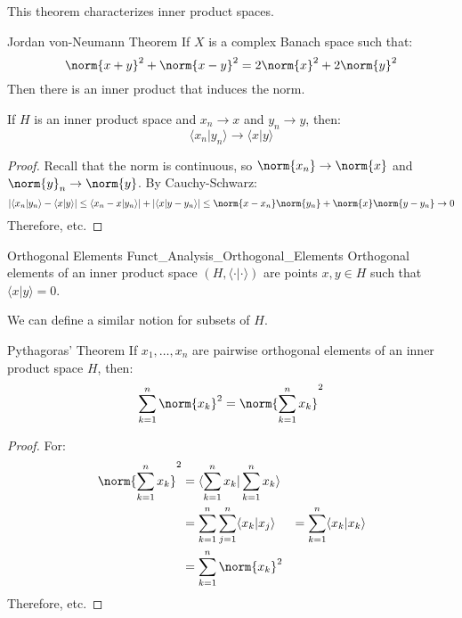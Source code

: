     This theorem characterizes inner product spaces.
    \begin{ltheorem}{Jordan von-Neumann Theorem}
        If $X$ is a complex Banach space such that:
        \begin{equation}
            \norm{x+y}^{2}+\norm{x-y}^{2}
            =2\norm{x}^{2}+2\norm{y}^{2}
        \end{equation}
        Then there is an inner product that induces
        the norm.
    \end{ltheorem}
    \begin{theorem}
        If $H$ is an inner product space and
        $x_{n}\rightarrow{x}$ and
        $y_{n}\rightarrow{y}$, then:
        \begin{equation}
            \langle{x_{n}|y_{n}}\rangle
            \rightarrow\langle{x|y}\rangle
        \end{equation}
    \end{theorem}
    \begin{proof}
        Recall that the norm is continuous, so
        $\norm{x_{n}}\rightarrow\norm{x}$ and
        $\norm{y}_{n}\rightarrow\norm{y}$. By Cauchy-Schwarz:
        \begin{equation}
            |\langle{x_{n}|y_{n}}\rangle-\langle{x|y}\rangle|
            \leq\langle{x_{n}-x|y_{n}}\rangle|+
                |\langle{x|y-y_{n}}\rangle|
            \leq\norm{x-x_{n}}\norm{y_{n}}+
                \norm{x}\norm{y-y_{n}}
            \rightarrow{0}
        \end{equation}
        Therefore, etc.
    \end{proof}
    \begin{ldefinition}{Orthogonal Elements}
          {Funct_Analysis_Orthogonal_Elements}
        Orthogonal elements of an inner product space
        $(H,\langle{\cdot|\cdot}\rangle)$ are points
        $x,y\in{H}$ such that
        $\langle{x|y}\rangle=0$.
    \end{ldefinition}
    We can define a similar notion for subsets of $H$.
    \begin{ltheorem}{Pythagoras' Theorem}
        If $x_{1},\dots,x_{n}$ are pairwise orthogonal
        elements of an inner product space $H$, then:
        \begin{equation}
            \sum_{k=1}^{n}\norm{x_{k}}^{2}=
            \norm{\sum_{k=1}^{n}x_{k}}^{2}
        \end{equation}
    \end{ltheorem}
    \begin{proof}
        For:
        \begin{align}
            \norm{\sum_{k=1}^{n}x_{k}}^{2}
            &=\langle{\sum_{k=1}^{n}x_{k}|\sum_{k=1}^{n}x_{k}}
                \rangle\\
            &=\sum_{k=1}^{n}\sum_{j=1}^{n}
                \langle{x_{k}|x_{j}}\rangle
            &=\sum_{k=1}^{n}\langle{x_{k}|x_{k}}\rangle\\
            &=\sum_{k=1}^{n}\norm{x_{k}}^{2}
        \end{align}
        Therefore, etc.
    \end{proof}
